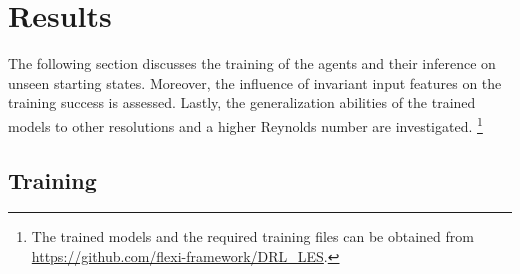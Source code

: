 \section{Results}
\label{sec:results}

The following section discusses the training of the agents and their inference on unseen starting states.
Moreover, the influence of invariant input features on the training success is assessed.
Lastly, the generalization abilities of the trained models to other resolutions and a higher Reynolds number are investigated.%
\footnote{The trained models and the required training files can be obtained from \url{https://github.com/flexi-framework/DRL_LES}.}

\subsection{Training}
\label{sec:results_training}

